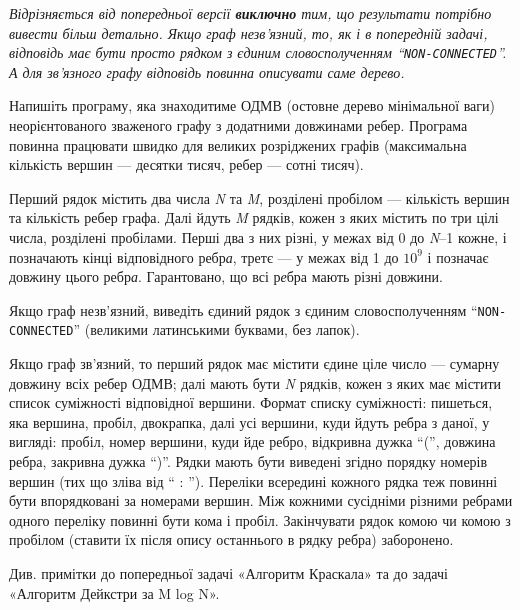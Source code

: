 ﻿{\it Відрізняється від попередньої версії {\bf виключно} тим, що результати потрібно вивести більш детально. Якщо граф незв'язний, то, як і в попередній задачі, відповідь має бути просто рядком з єдиним словосполученням ``{\tt NON-CONNECTED}''. А для зв'язного графу відповідь повинна описувати саме дерево.} 

Напишіть програму, яка знаходитиме ОДМВ (остовне дерево мінімальної ваги) неорієнтованого зваженого графу з додатними довжинами ребер. Програма повинна працювати швидко для великих розріджених графів (максимальна кількість вершин --- десятки тисяч, ребер --- сотні тисяч).

\InputFile
Перший рядок містить два числа {\it N} та {\it M}, розділені пробілом --- кількість вершин та кількість ребер графа. Далі йдуть {\it M} рядків, кожен з яких містить по три цілі числа, розділені пробілами. Перші два з них різні, у межах від 0 до {\it N}–1 кожне, і позначають кінці відповідного ребр{\it а}, третє — у межах від 1 до $10^9$ і позначає довжину цього ребр{\it а}. Гарантовано, що всі р{\it е}бра мають різні довжини.

\OutputFile
Якщо граф незв'язний, виведіть єдиний рядок з єдиним словосполученням ``{\tt NON-CONNECTED}'' (великими латинськими буквами, без лапок).

Якщо граф зв'язний, то перший рядок має містити єдине ціле число --- сумарну довжину всіх ребер ОДМВ; далі мають бути {\it N} рядків, кожен з яких має містити список суміжності відповідної вершини. Формат списку суміжності: пишеться, яка вершина, пробіл, двокрапка, далі усі вершини, куди йдуть ребра з даної, у вигляді: пробіл, номер вершини, куди йде ребро, відкривна дужка ``('', довжина ребра, закривна дужка ``)''. Рядки мають бути виведені згідно порядку номерів вершин (тих що зліва від `` : ''). Переліки всередині кожного рядка теж повинні бути впорядковані за номерами вершин. Між кожними сусідніми різними ребрами одного переліку повинні бути кома і пробіл. Закінчувати рядок комою чи комою з пробілом (ставити їх після опису останнього в рядку ребра) заборонено.

\Examples

\begin{example}
\end{example}

\Note

Див. примітки до попередньої задачі «Алгоритм Краскала» та до задачі «Алгоритм Дейкстри за M log N».